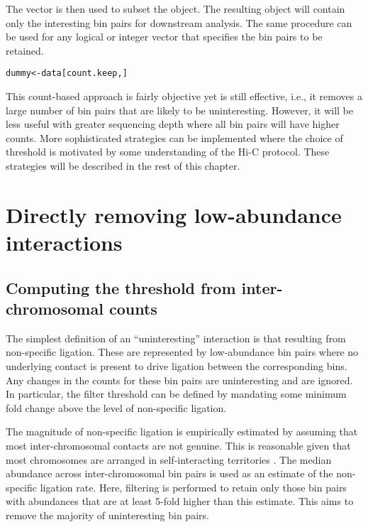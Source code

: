 \documentclass{report}\usepackage[]{graphicx}\usepackage[usenames,dvipsnames]{color}
\newcommand{\hlstd}[1]{\textcolor[rgb]{0.251,0.251,0.251}{#1}}%
\newcommand{\hlkwb}[1]{\textcolor[rgb]{0,0,0}{#1}}%
\newenvironment{knitrout}{}{} %
\begin{document}
The  vector is then used to subset the  object.
The resulting  object will contain only the interesting bin pairs for downstream analysis.
The same procedure can be used for any logical or integer vector that specifies the bin pairs to be retained.

\begin{knitrout}
\color{fgcolor}\begin{kframe}
\begin{alltt}
\hlstd{dummy} \hlkwb{<-} \hlstd{data[count.keep,]}
\end{alltt}
\end{kframe}
\end{knitrout}

This count-based approach is fairly objective yet is still effective, i.e., it removes a large number of bin pairs that are likely to be uninteresting.
However, it will be less useful with greater sequencing depth where all bin pairs will have higher counts.
More sophisticated strategies can be implemented where the choice of threshold is motivated by some understanding of the Hi-C protocol.
These strategies will be described in the rest of this chapter.

\section{Directly removing low-abundance interactions}
\label{sec:direct}

\subsection{Computing the threshold from inter-chromosomal counts}
The simplest definition of an ``uninteresting'' interaction is that resulting from non-specific ligation. 
These are represented by low-abundance bin pairs where no underlying contact is present to drive ligation between the corresponding bins. 
Any changes in the counts for these bin pairs are uninteresting and are ignored.
In particular, the filter threshold can be defined by mandating some minimum fold change above the level of non-specific ligation.

The magnitude of non-specific ligation is empirically estimated by assuming that most inter-chromosomal contacts are not genuine. 
This is reasonable given that most chromosomes are arranged in self-interacting territories \cite{bickmore2013spatial}.
The median abundance across inter-chromosomal bin pairs is used as an estimate of the non-specific ligation rate. 
Here, filtering is performed to retain only those bin pairs with abundances that are at least 5-fold higher than this estimate.
This aims to remove the majority of uninteresting bin pairs.
\end{document}

